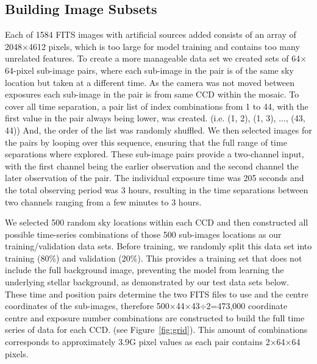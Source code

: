 \documentclass{aastex631}
\begin{document}
\subsection{Building Image Subsets}
\label{subsect:subsets}
Each of 1584 FITS images with artificial sources added consists of an array of 2048$\times$4612 pixels, which is too large for model training and contains too many unrelated features.  
To create a more manageable data set we created sets of 64$\times$64-pixel sub-image pairs, where each sub-image in the pair is of the same sky location but taken at a different time.
As the camera was not moved between exposures each sub-image in the pair is from same CCD within the mosaic.
To cover all time separation, a pair list of index combinations from 1 to 44, with the first value in the pair always being lower, was created. (i.e. (1, 2), (1, 3), ..., (43, 44))
And, the order of the list was randomly shuffled.
We then selected images for the pairs by looping over this sequence, ensuring that the full range of time separations where  explored.
These sub-image pairs provide a two-channel input, with the first channel being the earlier observation and the second channel the later observation of the pair. 
The individual exposure time was 205 seconds and the total observing period was 3 hours, resulting in the time separations between two channels ranging from a few minutes to 3 hours. 

We selected 500 random sky locations within each CCD and then constructed all possible time-series combinations of those 500 sub-images locations as our training/validation data sets.
Before training, we randomly split this data set into training (80\%) and validation (20\%).
This provides a training set that does not include the full background image, preventing the model from learning the underlying stellar background, as demonstrated by our test data sets below.
These time and position pairs determine the two FITS files to use and the centre coordinates of the sub-images, therefore 500$\times$44$\times$43$\div2$=473,000 coordinate centre and exposure number combinations are constructed to build the full time series of data for each CCD. (see Figure~\ref{fig:grid}).
This amount of combinations corresponds to approximately 3.9G pixel values as each pair contains 2$\times$64$\times$64 pixels.
\end{document}
